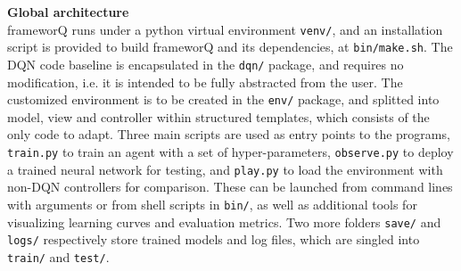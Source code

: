 \textbf{Global architecture} \\
frameworQ runs under a python virtual environment \texttt{venv/}, and an installation script is provided to build frameworQ and its dependencies, at \texttt{bin/make.sh}. The DQN code baseline is encapsulated in the \texttt{dqn/} package, and requires no modification, i.e. it is intended to be fully abstracted from the user. The customized environment is to be created in the \texttt{env/} package, and splitted into model, view and controller within structured templates, which consists of the only code to adapt. Three main scripts are used as entry points to the programs, \texttt{train.py} to train an agent with a set of hyper-parameters, \texttt{observe.py} to deploy a trained neural network for testing, and \texttt{play.py} to load the environment with non-DQN controllers for comparison. These can be launched from command lines with arguments or from shell scripts in \texttt{bin/}, as well as additional tools for visualizing learning curves and evaluation metrics. Two more folders \texttt{save/} and \texttt{logs/} respectively store trained models and log files, which are singled into \texttt{train/} and \texttt{test/}.

\pagebreak

